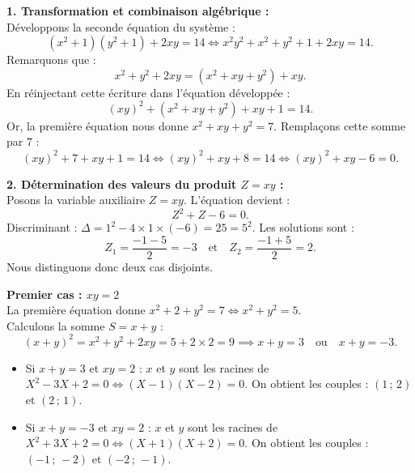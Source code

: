 \documentclass[11pt,a4paper]{article}
\begin{document}
\begin{correctionbox}
\textbf{1. Transformation et combinaison algébrique :}\\
Développons la seconde équation du système :
\[
(x^2 + 1)(y^2 + 1) + 2xy = 14 \iff x^2 y^2 + x^2 + y^2 + 1 + 2xy = 14.
\]
Remarquons que :
\[
x^2 + y^2 + 2xy = (x^2 + xy + y^2) + xy.
\]
En réinjectant cette écriture dans l'équation développée :
\[
(xy)^2 + (x^2 + xy + y^2) + xy + 1 = 14.
\]
Or, la première équation nous donne $x^2 + xy + y^2 = 7$. Remplaçons cette somme par $7$ :
\[
(xy)^2 + 7 + xy + 1 = 14 \iff (xy)^2 + xy + 8 = 14 \iff (xy)^2 + xy - 6 = 0.
\]

\textbf{2. Détermination des valeurs du produit $Z = xy$ :}\\
Posons la variable auxiliaire $Z = xy$. L'équation devient :
\[
Z^2 + Z - 6 = 0.
\]
Discriminant : $\Delta = 1^2 - 4 \times 1 \times (-6) = 25 = 5^2$.
Les solutions sont :
\[
Z_1 = \frac{-1 - 5}{2} = -3 \quad \text{et} \quad Z_2 = \frac{-1 + 5}{2} = 2.
\]
Nous distinguons donc deux cas disjoints.

\textbf{Premier cas : $xy = 2$}\\
La première équation donne $x^2 + 2 + y^2 = 7 \iff x^2 + y^2 = 5$.\\
Calculons la somme $S = x + y$ :
\[
(x + y)^2 = x^2 + y^2 + 2xy = 5 + 2 \times 2 = 9 \implies x + y = 3 \quad \text{ou} \quad x + y = -3.
\]
\begin{itemize}[leftmargin=*,label=\textbullet]
    \item Si $x + y = 3$ et $xy = 2$ : $x$ et $y$ sont les racines de $X^2 - 3X + 2 = 0 \iff (X - 1)(X - 2) = 0$.
    On obtient les couples : $(1\,;\,2)$ et $(2\,;\,1)$.
    \item Si $x + y = -3$ et $xy = 2$ : $x$ et $y$ sont les racines de $X^2 + 3X + 2 = 0 \iff (X + 1)(X + 2) = 0$.
    On obtient les couples : $(-1\,;\,-2)$ et $(-2\,;\,-1)$.
\end{itemize}


\end{correctionbox}
\end{document}
